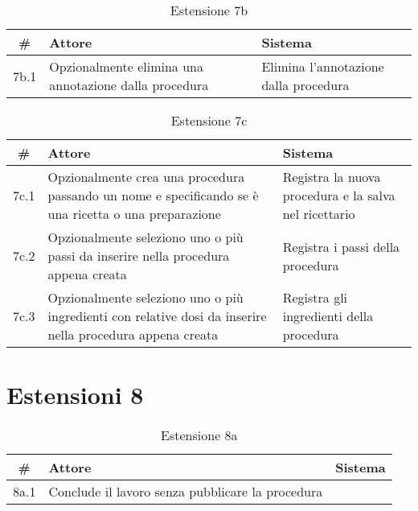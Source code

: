 \begin{table}[H]\centering\caption*{Estensione 7b}
      \small
      \begin{tabular}{|c|p{7cm}|p{6.24cm}|}
            \hline\bfseries \# & \bfseries Attore                                      & \bfseries Sistema                     \\\hline
            7b.1               & Opzionalmente elimina una annotazione dalla procedura & Elimina l’annotazione dalla procedura \\\hline
      \end{tabular}
\end{table}

\begin{table}[H]\centering\caption*{Estensione 7c}
      \small
      \begin{tabular}{|c|p{7cm}|p{6.24cm}|}
            \hline\bfseries \# & \bfseries Attore                                                                                          & \bfseries Sistema                                     \\\hline
            7c.1               & Opzionalmente crea una procedura passando un nome e specificando se è una ricetta o una preparazione      & Registra la nuova procedura e la salva nel ricettario \\\hline
            7c.2               & Opzionalmente seleziono uno o più passi da inserire nella procedura appena creata                         & Registra i passi della procedura                      \\\hline
            7c.3               & Opzionalmente seleziono uno o più ingredienti con relative dosi da inserire nella procedura appena creata & Registra gli ingredienti della procedura              \\\hline
      \end{tabular}
\end{table}

\section*{Estensioni 8}
\begin{table}[H]\centering\caption*{Estensione 8a}
      \small
      \begin{tabular}{|c|p{7cm}|p{6.24cm}|}
            \hline\bfseries \# & \bfseries Attore                                 & \bfseries Sistema \\\hline
            8a.1               & Conclude il lavoro senza pubblicare la procedura &                   \\\hline
      \end{tabular}
\end{table}
\normalsize